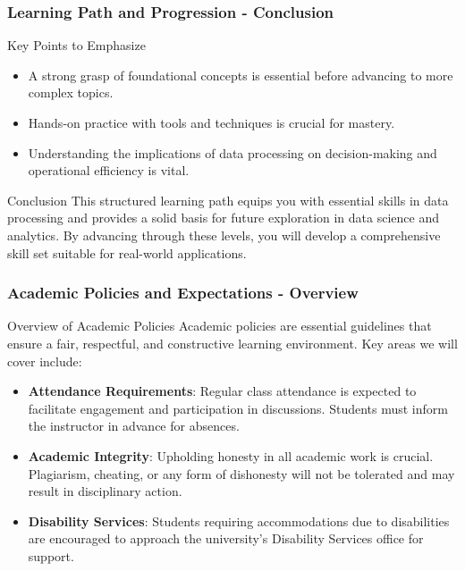 \documentclass[aspectratio=169]{beamer}
\begin{document}
\begin{frame}[fragile]
    \frametitle{Learning Path and Progression - Conclusion}
    \begin{block}{Key Points to Emphasize}
        \begin{itemize}
            \item A strong grasp of foundational concepts is essential before advancing to more complex topics.
            \item Hands-on practice with tools and techniques is crucial for mastery.
            \item Understanding the implications of data processing on decision-making and operational efficiency is vital. 
        \end{itemize}
    \end{block}

    \begin{block}{Conclusion}
        This structured learning path equips you with essential skills in data processing and provides a solid basis for future exploration in data science and analytics.
        By advancing through these levels, you will develop a comprehensive skill set suitable for real-world applications.
    \end{block}
\end{frame}

\begin{frame}[fragile]
    \frametitle{Academic Policies and Expectations - Overview}
    \begin{block}{Overview of Academic Policies}
        Academic policies are essential guidelines that ensure a fair, respectful, and constructive learning environment. Key areas we will cover include:
    \end{block}
    \begin{itemize}
        \item \textbf{Attendance Requirements}: Regular class attendance is expected to facilitate engagement and participation in discussions. Students must inform the instructor in advance for absences.
        \item \textbf{Academic Integrity}: Upholding honesty in all academic work is crucial. Plagiarism, cheating, or any form of dishonesty will not be tolerated and may result in disciplinary action.
        \item \textbf{Disability Services}: Students requiring accommodations due to disabilities are encouraged to approach the university's Disability Services office for support.
    \end{itemize}
\end{frame}
\end{document}
